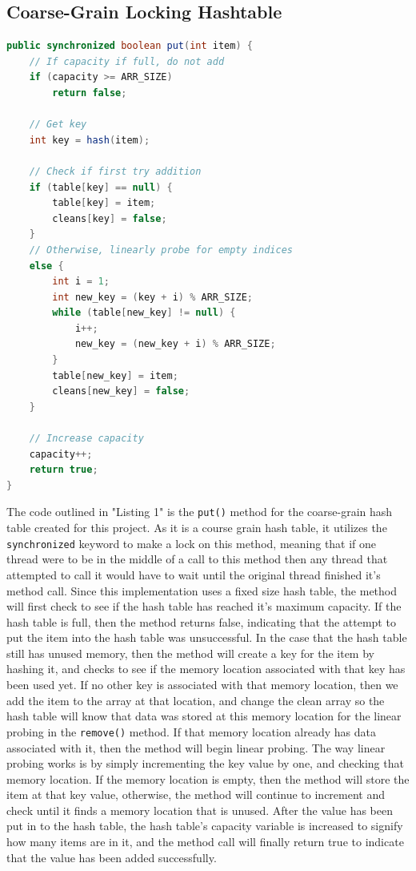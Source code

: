 \documentclass[conference]{IEEEtran}
\begin{document}
\subsection{Coarse-Grain Locking Hashtable}
\begin{lstlisting}[language={Java},caption=Source code for the course-grain put() method.,captionpos=b,breaklines=true,frame=single]
public synchronized boolean put(int item) {
    // If capacity if full, do not add
    if (capacity >= ARR_SIZE)
        return false;

    // Get key
    int key = hash(item);

    // Check if first try addition
    if (table[key] == null) {
        table[key] = item;
        cleans[key] = false;
    }
    // Otherwise, linearly probe for empty indices
    else {
        int i = 1;
        int new_key = (key + i) % ARR_SIZE;
        while (table[new_key] != null) {
            i++;
            new_key = (new_key + i) % ARR_SIZE;
        }
        table[new_key] = item;
        cleans[new_key] = false;
    }

    // Increase capacity
    capacity++;
    return true;
}
\end{lstlisting}

The code outlined in "Listing 1" is the \verb|put()| method for the coarse-grain hash table created for this project. As it is a course grain hash table,
it utilizes the \verb|synchronized| keyword to make a lock on this method, meaning that if one thread were to be in the middle of a call to this method
then any thread that attempted to call it would have to wait until the original thread finished it's method call. Since this implementation uses a fixed size hash table, 
the method will first check to see if the hash table has reached it's maximum capacity. If the hash table is full, then the method returns false,
indicating that the attempt to put the item into the hash table was unsuccessful. In the case that the hash table still has unused memory, then the method
will create a key for the item by hashing it, and checks to see if the memory location associated with that key has been used yet. If no other key is associated
with that memory location, then we add the item to the array at that location, and change the clean array so the hash table will know that data was stored 
at this memory location for the linear probing in the \verb|remove()| method. If that memory location already has data associated with it, then the method will
begin linear probing. The way linear probing works is by simply incrementing the key value by one, and checking that memory location. If the memory location
is empty, then the method will store the item at that key value, otherwise, the method will continue to increment and check until it finds a memory location
that is unused. After the value has been put in to the hash table, the hash table's capacity variable is increased to signify how many items are in it, and 
the method call will finally return true to indicate that the value has been added successfully.
\end{document}
